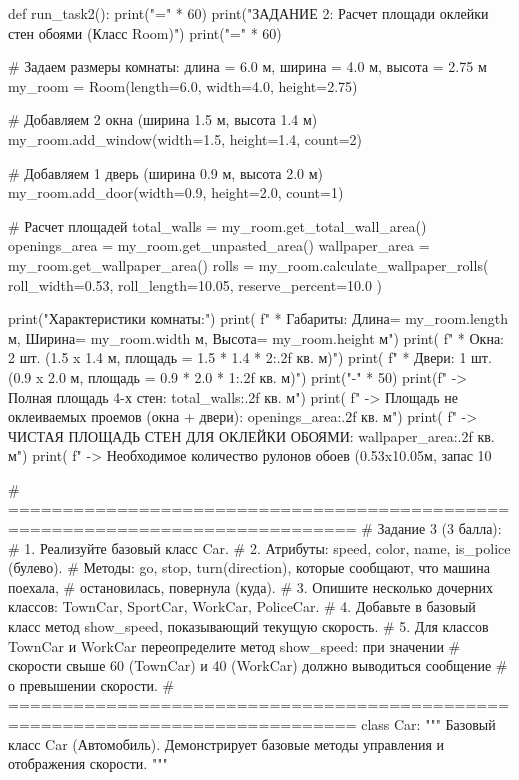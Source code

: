 \documentclass[14pt,a4paper]{extarticle}
\begin{document}
\begin{CodeListing}
def run_task2():
    print("=" * 60)
    print("ЗАДАНИЕ 2: Расчет площади оклейки стен обоями (Класс Room)")
    print("=" * 60)

    # Задаем размеры комнаты: длина = 6.0 м, ширина = 4.0 м, высота = 2.75 м
    my_room = Room(length=6.0, width=4.0, height=2.75)

    # Добавляем 2 окна (ширина 1.5 м, высота 1.4 м)
    my_room.add_window(width=1.5, height=1.4, count=2)

    # Добавляем 1 дверь (ширина 0.9 м, высота 2.0 м)
    my_room.add_door(width=0.9, height=2.0, count=1)

    # Расчет площадей
    total_walls = my_room.get_total_wall_area()
    openings_area = my_room.get_unpasted_area()
    wallpaper_area = my_room.get_wallpaper_area()
    rolls = my_room.calculate_wallpaper_rolls(
        roll_width=0.53,
        roll_length=10.05,
        reserve_percent=10.0
    )

    print("Характеристики комнаты:")
    print(
        f"  * Габариты: Длина={
            my_room.length} м, Ширина={
            my_room.width} м, Высота={
                my_room.height} м")
    print(
        f"  * Окна: 2 шт. (1.5 x 1.4 м, площадь = {
            1.5 *
            1.4 *
            2:.2f} кв. м)")
    print(
        f"  * Двери: 1 шт. (0.9 x 2.0 м, площадь = {
            0.9 *
            2.0 *
            1:.2f} кв. м)")
    print("-" * 50)
    print(f"  -> Полная площадь 4-х стен: {total_walls:.2f} кв. м")
    print(
        f"  -> Площадь не оклеиваемых проемов (окна + двери): {openings_area:.2f} кв. м")
    print(
        f"  -> ЧИСТАЯ ПЛОЩАДЬ СТЕН ДЛЯ ОКЛЕЙКИ ОБОЯМИ: {wallpaper_area:.2f} кв. м")
    print(
        f"  -> Необходимое количество рулонов обоев (0.53x10.05м, запас 10%


# ==============================================================================
# Задание 3 (3 балла):
# 1. Реализуйте базовый класс Car.
# 2. Атрибуты: speed, color, name, is_police (булево).
#    Методы: go, stop, turn(direction), которые сообщают, что машина поехала,
#    остановилась, повернула (куда).
# 3. Опишите несколько дочерних классов: TownCar, SportCar, WorkCar, PoliceCar.
# 4. Добавьте в базовый класс метод show_speed, показывающий текущую скорость.
# 5. Для классов TownCar и WorkCar переопределите метод show_speed: при значении
#    скорости свыше 60 (TownCar) и 40 (WorkCar) должно выводиться сообщение
#    о превышении скорости.
# ==============================================================================
class Car:
    """
    Базовый класс Car (Автомобиль).
    Демонстрирует базовые методы управления и отображения скорости.
    """


\end{CodeListing}
\end{document}
